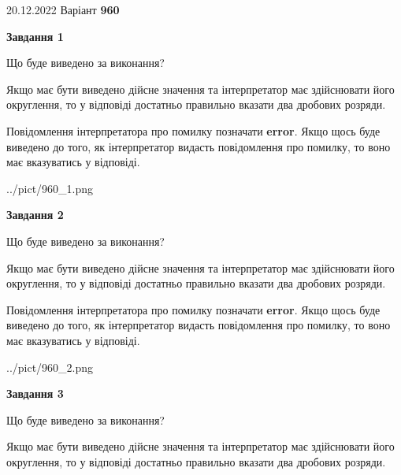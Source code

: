 \documentclass[12pt, ukrainian]{article}
\begin{document}
{20.12.2022 Варіант \No \textbf { 960 }\par}
{
\begin {Large}

{\begin {center}\textbf{Завдання 1}\end {center}}\par
Що буде виведено за виконання? \par

Якщо має бути виведено дійсне значення та інтерпретатор має здійснювати його округлення, 
то у відповіді достатньо правильно вказати два дробових розряди.

Повідомлення інтерпретатора про помилку позначати \textbf{error}.
Якщо щось буде виведено до того, як інтерпретатор видасть повідомлення про помилку, 
то воно має вказуватись у відповіді. \par

\begin{center}
	{../pict/960_1.png}
\end{center}
\newpage

{\begin {center}\textbf{Завдання 2}\end {center}}\par
Що буде виведено за виконання? \par

Якщо має бути виведено дійсне значення та інтерпретатор має здійснювати його округлення, 
то у відповіді достатньо правильно вказати два дробових розряди.

Повідомлення інтерпретатора про помилку позначати \textbf{error}.
Якщо щось буде виведено до того, як інтерпретатор видасть повідомлення про помилку, 
то воно має вказуватись у відповіді. \par

\begin{center}
	{../pict/960_2.png}
\end{center}
\newpage

{\begin {center}\textbf{Завдання 3}\end {center}}\par
Що буде виведено за виконання? \par

Якщо має бути виведено дійсне значення та інтерпретатор має здійснювати його округлення, 
то у відповіді достатньо правильно вказати два дробових розряди.


\end{Large}}
\end{document}
